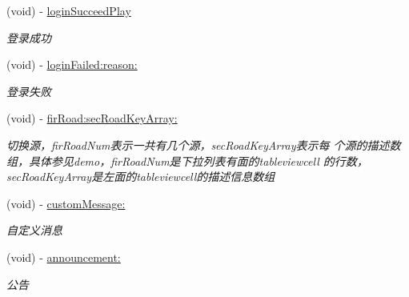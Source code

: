 \begin{DoxyCompactItemize}
\mbox{\label{protocol_request_data_delegate_01-p_af29017f1177c5a14957dc3453238a171}} 
(void) -\/ \hyperlink{protocol_request_data_delegate_01-p_af29017f1177c5a14957dc3453238a171}{login\+Succeed\+Play}
\begin{DoxyCompactList}\small\item\em 登录成功 \end{DoxyCompactList}\item 
\mbox{\label{protocol_request_data_delegate_01-p_aa998619e251865f7794128131f6b9036}} 
(void) -\/ \hyperlink{protocol_request_data_delegate_01-p_aa998619e251865f7794128131f6b9036}{login\+Failed\+:reason\+:}
\begin{DoxyCompactList}\small\item\em 登录失败 \end{DoxyCompactList}\item 
\mbox{\label{protocol_request_data_delegate_01-p_af2d37b5ea9d76ea558e86611f76c5914}} 
(void) -\/ \hyperlink{protocol_request_data_delegate_01-p_af2d37b5ea9d76ea558e86611f76c5914}{fir\+Road\+:sec\+Road\+Key\+Array\+:}
\begin{DoxyCompactList}\small\item\em 切换源，fir\+Road\+Num表示一共有几个源，sec\+Road\+Key\+Array表示每 个源的描述数组，具体参见demo，fir\+Road\+Num是下拉列表有面的tableviewcell 的行数，sec\+Road\+Key\+Array是左面的tableviewcell的描述信息数组 \end{DoxyCompactList}\item 
\mbox{\label{protocol_request_data_delegate_01-p_ab78c990f513cf34d1990fd5ca7232336}} 
(void) -\/ \hyperlink{protocol_request_data_delegate_01-p_ab78c990f513cf34d1990fd5ca7232336}{custom\+Message\+:}
\begin{DoxyCompactList}\small\item\em 自定义消息 \end{DoxyCompactList}\item 
\mbox{\label{protocol_request_data_delegate_01-p_a084dbfc940ff86d96629ef6497692cbb}} 
(void) -\/ \hyperlink{protocol_request_data_delegate_01-p_a084dbfc940ff86d96629ef6497692cbb}{announcement\+:}
\begin{DoxyCompactList}\small\item\em 公告 \end{DoxyCompactList}\item 

\end{DoxyCompactItemize}
